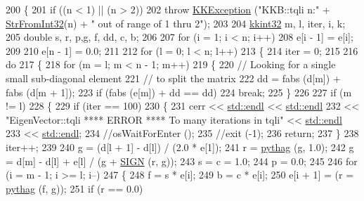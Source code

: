 \begin{DoxyCode}
200 \{
201   \textcolor{keywordflow}{if}  ((n < 1)  ||  (n > 2))
202     \textcolor{keywordflow}{throw} \hyperlink{class_k_k_b_1_1_k_k_exception}{KKException} (\textcolor{stringliteral}{"KKB::tqli  n:"} + \hyperlink{namespace_k_k_b_a66adf53f607bda7ab0d3e1c3945e792e}{StrFromInt32}(n) + \textcolor{stringliteral}{" out of range of 1 thru
       2"});
203 
204   \hyperlink{namespace_k_k_b_a8fa4952cc84fda1de4bec1fbdd8d5b1b}{kkint32}  m, l, iter, i, k;
205   \textcolor{keywordtype}{double}  s, r, p,g, f, dd, c, b;
206 
207   \textcolor{keywordflow}{for}  (i = 1;  i < n;  i++)
208     e[i - 1] = e[i];
209 
210   e[n - 1] = 0.0;
211 
212   \textcolor{keywordflow}{for}  (l = 0;  l < n;  l++)
213   \{
214     iter = 0;
215 
216     \textcolor{keywordflow}{do} 
217     \{
218       \textcolor{keywordflow}{for}  (m = l;  m < n - 1;  m++)
219       \{
220         \textcolor{comment}{// Looking for a single small sub-diagonal element}
221         \textcolor{comment}{// to split the matrix}
222         dd = fabs (d[m]) + fabs (d[m + 1]);
223         \textcolor{keywordflow}{if}  (fabs (e[m]) + dd == dd)
224           \textcolor{keywordflow}{break};
225       \}
226 
227       \textcolor{keywordflow}{if}  (m != l)
228       \{
229         \textcolor{keywordflow}{if}  (iter == 100)
230         \{
231           cerr << \hyperlink{namespace_k_k_b_ad1f50f65af6adc8fa9e6f62d007818a8}{std::endl} << \hyperlink{namespace_k_k_b_ad1f50f65af6adc8fa9e6f62d007818a8}{std::endl}
232                << \textcolor{stringliteral}{"EigenVector::tqli    **** ERROR ****            To many iterations in tqli"} << 
      \hyperlink{namespace_k_k_b_ad1f50f65af6adc8fa9e6f62d007818a8}{std::endl}
233                << \hyperlink{namespace_k_k_b_ad1f50f65af6adc8fa9e6f62d007818a8}{std::endl};
234           \textcolor{comment}{//osWaitForEnter ();}
235           \textcolor{comment}{//exit (-1);}
236           \textcolor{keywordflow}{return};
237         \}
238         iter++;
239 
240         g = (d[l + 1] - d[l]) / (2.0 * e[1]);
241         r = \hyperlink{_eigen_vector_8cpp_ae7591fdd978e3a56d23226d39e12be0d}{pythag} (g, 1.0);
242         g = d[m] - d[l] + e[l] / (g + \hyperlink{_eigen_vector_8cpp_a73ed9c206e7e0031e9afbd17366ee779}{SIGN} (r, g));
243         s = c = 1.0;
244         p = 0.0;
245 
246         \textcolor{keywordflow}{for}  (i = m - 1;  i >= l;  i--)
247         \{
248           f = s * e[i];
249           b = c * e[i];
250           e[i + 1] = (r = \hyperlink{_eigen_vector_8cpp_ae7591fdd978e3a56d23226d39e12be0d}{pythag} (f, g));
251           \textcolor{keywordflow}{if}  (r == 0.0)

\end{DoxyCode}
